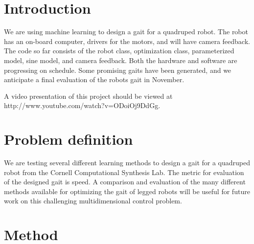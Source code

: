 \section{Introduction}

We are using machine learning to design a gait for a quadruped
robot. The robot has an on-board computer, drivers for the motors, and
will have camera feedback. The code so far consists of the robot
class, optimization class, parameterized model, sine model, and camera
feedback.  Both the hardware and software are progressing on schedule.
Some promising gaits have been generated, and we anticipate a final
evaluation of the robots gait in November.

A video presentation of this project should be viewed at http://www.youtube.com/watch?v=ODoiOj9DdGg.



\section{Problem definition}
We are testing several different learning methods to design a gait for 
a quadruped robot from the Cornell Computational Synthesis Lab. The metric 
for evaluation of the designed gait is speed. A comparison and evaluation 
of the many different methods available for optimizing the gait of legged 
robots will be useful for future work on this challenging multidimensional 
control problem.




\section{Method}

